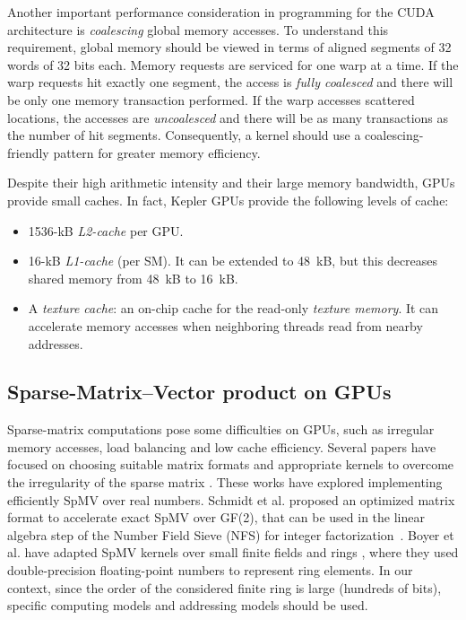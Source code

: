\documentclass[runningheads,orivec]{llncs}
\begin{document}
Another important performance consideration in programming for the CUDA architecture is \textit{coalescing} global memory accesses. To understand this requirement, global memory should be viewed in terms of aligned segments of 32 words of 32 bits each. Memory requests are serviced for one warp at a time. If the warp requests hit exactly one segment, the access is \textit{fully coalesced} and there will be only one memory transaction performed. If the warp accesses scattered locations, the accesses are \textit{uncoalesced} and there will be as many transactions as the number of hit segments. Consequently, a kernel should use a coalescing-friendly pattern for greater memory efficiency.      
 
Despite their high arithmetic intensity and their large memory bandwidth, GPUs provide small caches. In fact, Kepler GPUs provide the following levels of cache:
\begin{itemize}
\vspace*{-0.25cm}

\item 1536-kB \textit{L2-cache} per GPU.
\item 16-kB \textit{L1-cache} (per SM). It can be extended to 48~kB, but this decreases shared memory from 48~kB to 16~kB.
\item A \textit{texture cache}: an on-chip cache for the read-only \textit{texture memory}. It can accelerate memory accesses when neighboring threads read from nearby addresses.
\end{itemize}  

\vspace*{-0.5cm}

\subsection{Sparse-Matrix--Vector product on GPUs}
\vspace*{-0.25cm}

Sparse-matrix computations pose some difficulties on GPUs, such as irregular memory accesses, load balancing and low cache efficiency. Several papers have focused on choosing suitable matrix formats and appropriate kernels to overcome the irregularity of the sparse matrix \cite{BELL08,VAZQ09}. These works have explored implementing efficiently SpMV over real numbers. Schmidt et al. \cite{SHMI11} proposed an optimized matrix format to accelerate exact SpMV over GF(2), that can be used in the linear algebra step of the Number Field Sieve (NFS) for integer factorization~\cite{STAC08}. Boyer et al. \cite{BOYE10} have adapted SpMV kernels over small finite fields and rings , where they used double-precision floating-point numbers to represent ring elements. In our context, since the order of the considered finite ring is large (hundreds of bits), specific computing models and addressing models should be used.   
\end{document}

